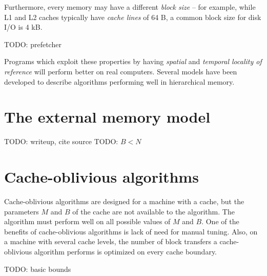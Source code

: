Furthermore, every memory may have a different \textit{block size} -- for example,
while L1 and L2 caches typically have \textit{cache lines} of 64 B, a common
block size for disk I/O is 4 kB.

TODO: prefetcher

Programs which exploit these properties by having \textit{spatial}
and \textit{temporal locality of reference} will perform better on real
computers. Several models have been developed to describe algorithms
performing well in hierarchical memory.

\section{The external memory model}
TODO: writeup, cite source
TODO: $B<N$

\section{Cache-oblivious algorithms}
Cache-oblivious algorithms are designed for a machine with a cache, but
the parameters $M$ and $B$ of the cache are not available to the algorithm.
The algorithm must perform well on all possible values of $M$ and $B$.
One of the benefits of cache-oblivious algorithms is lack of need for manual
tuning. Also, on a machine with several cache levels, the number of block transfers
a cache-oblivious algorithm performs is optimized on every cache boundary.

TODO: basic bounds
